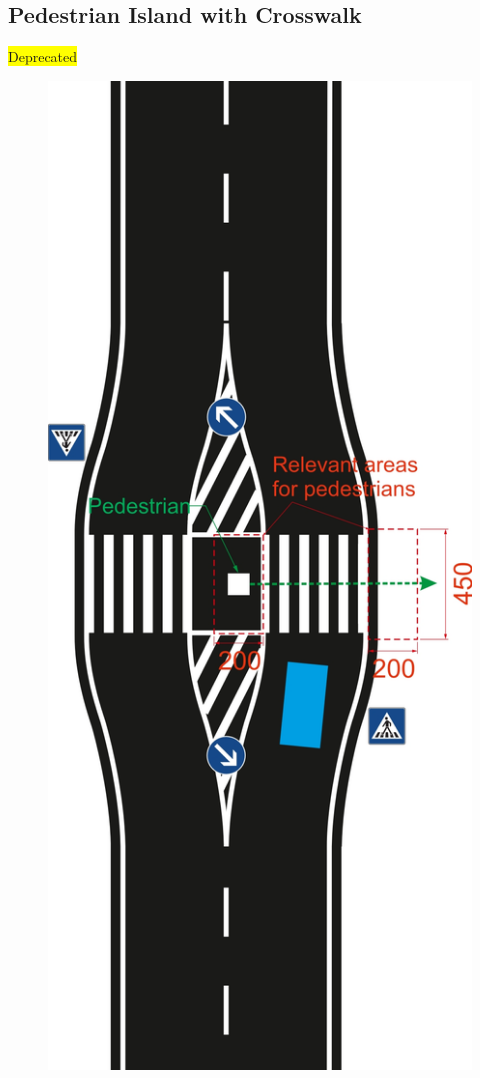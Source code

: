\subsection{Pedestrian Island with Crosswalk}
\colorbox{yellow}{\large Deprecated}
\begin{figure}[H]
	\begin{center}
		\centering\includegraphics[]{graphics/Abb_11_pedestrian_island_crosswalk.jpg}
	\end{center}
\end{figure}

